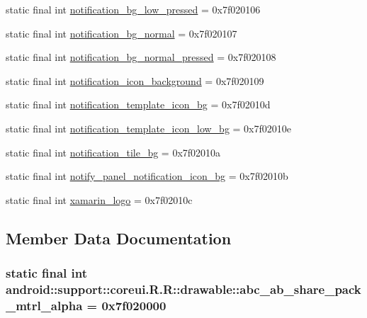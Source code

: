 \begin{CompactItemize}
\item 
static final int \hyperlink{classandroid_1_1support_1_1coreui_1_1_r_1_1drawable_8c1b3b4b0a46f949b63c5aec5d4e3afd}{notification\_\-bg\_\-low\_\-pressed} = 0x7f020106
\item 
static final int \hyperlink{classandroid_1_1support_1_1coreui_1_1_r_1_1drawable_6912c17489de8b93c28fabdece8a3f21}{notification\_\-bg\_\-normal} = 0x7f020107
\item 
static final int \hyperlink{classandroid_1_1support_1_1coreui_1_1_r_1_1drawable_173c0f856189cb29c7314bee10406332}{notification\_\-bg\_\-normal\_\-pressed} = 0x7f020108
\item 
static final int \hyperlink{classandroid_1_1support_1_1coreui_1_1_r_1_1drawable_6559118e04520f2390dc489162e410fc}{notification\_\-icon\_\-background} = 0x7f020109
\item 
static final int \hyperlink{classandroid_1_1support_1_1coreui_1_1_r_1_1drawable_0b962a90c1a69a467e2da06e72c5b877}{notification\_\-template\_\-icon\_\-bg} = 0x7f02010d
\item 
static final int \hyperlink{classandroid_1_1support_1_1coreui_1_1_r_1_1drawable_ebf3333726a3bc75843f360108277c8c}{notification\_\-template\_\-icon\_\-low\_\-bg} = 0x7f02010e
\item 
static final int \hyperlink{classandroid_1_1support_1_1coreui_1_1_r_1_1drawable_02a1daf2e046d8cad5de6d189ded720f}{notification\_\-tile\_\-bg} = 0x7f02010a
\item 
static final int \hyperlink{classandroid_1_1support_1_1coreui_1_1_r_1_1drawable_505edb86fb4e2b9b1d99cba50594cb5f}{notify\_\-panel\_\-notification\_\-icon\_\-bg} = 0x7f02010b
\item 
static final int \hyperlink{classandroid_1_1support_1_1coreui_1_1_r_1_1drawable_8bfcd2c2e3420efa0e9b74a7d17f5300}{xamarin\_\-logo} = 0x7f02010c
\end{CompactItemize}


\subsection{Member Data Documentation}
\hypertarget{classandroid_1_1support_1_1coreui_1_1_r_1_1drawable_1f3bd2786cff7a5c46006568b9b044f8}{
\subsubsection[{abc\_\-ab\_\-share\_\-pack\_\-mtrl\_\-alpha}]{\setlength{\rightskip}{0pt plus 5cm}static final int android::support::coreui.R.R::drawable::abc\_\-ab\_\-share\_\-pack\_\-mtrl\_\-alpha = 0x7f020000}}
\label{classandroid_1_1support_1_1coreui_1_1_r_1_1drawable_1f3bd2786cff7a5c46006568b9b044f8}



